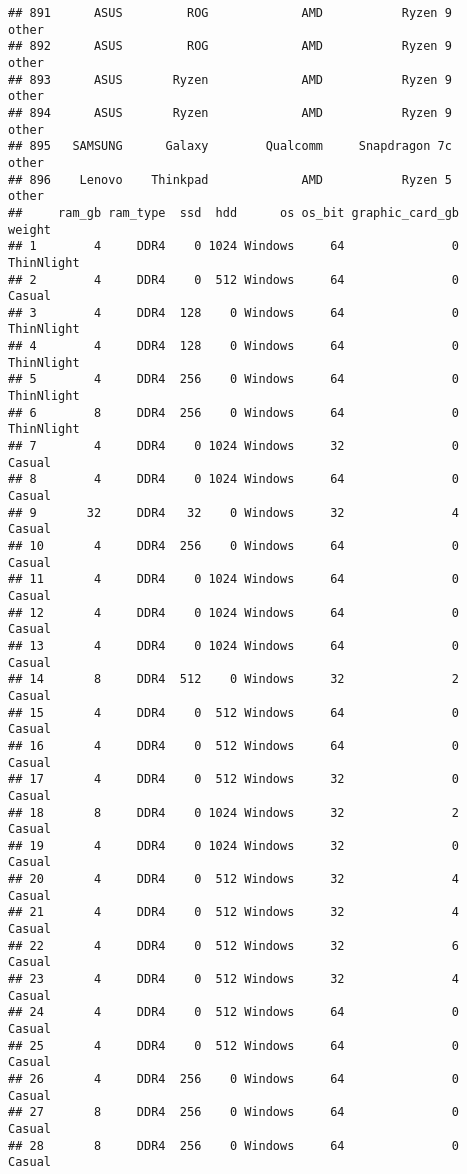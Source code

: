 \documentclass[
]{article}
\begin{document}
\begin{verbatim}
## 891      ASUS         ROG             AMD           Ryzen 9           other
## 892      ASUS         ROG             AMD           Ryzen 9           other
## 893      ASUS       Ryzen             AMD           Ryzen 9           other
## 894      ASUS       Ryzen             AMD           Ryzen 9           other
## 895   SAMSUNG      Galaxy        Qualcomm     Snapdragon 7c           other
## 896    Lenovo    Thinkpad             AMD           Ryzen 5           other
##     ram_gb ram_type  ssd  hdd      os os_bit graphic_card_gb     weight
## 1        4     DDR4    0 1024 Windows     64               0 ThinNlight
## 2        4     DDR4    0  512 Windows     64               0     Casual
## 3        4     DDR4  128    0 Windows     64               0 ThinNlight
## 4        4     DDR4  128    0 Windows     64               0 ThinNlight
## 5        4     DDR4  256    0 Windows     64               0 ThinNlight
## 6        8     DDR4  256    0 Windows     64               0 ThinNlight
## 7        4     DDR4    0 1024 Windows     32               0     Casual
## 8        4     DDR4    0 1024 Windows     64               0     Casual
## 9       32     DDR4   32    0 Windows     32               4     Casual
## 10       4     DDR4  256    0 Windows     64               0     Casual
## 11       4     DDR4    0 1024 Windows     64               0     Casual
## 12       4     DDR4    0 1024 Windows     64               0     Casual
## 13       4     DDR4    0 1024 Windows     64               0     Casual
## 14       8     DDR4  512    0 Windows     32               2     Casual
## 15       4     DDR4    0  512 Windows     64               0     Casual
## 16       4     DDR4    0  512 Windows     64               0     Casual
## 17       4     DDR4    0  512 Windows     32               0     Casual
## 18       8     DDR4    0 1024 Windows     32               2     Casual
## 19       4     DDR4    0 1024 Windows     32               0     Casual
## 20       4     DDR4    0  512 Windows     32               4     Casual
## 21       4     DDR4    0  512 Windows     32               4     Casual
## 22       4     DDR4    0  512 Windows     32               6     Casual
## 23       4     DDR4    0  512 Windows     32               4     Casual
## 24       4     DDR4    0  512 Windows     64               0     Casual
## 25       4     DDR4    0  512 Windows     64               0     Casual
## 26       4     DDR4  256    0 Windows     64               0     Casual
## 27       8     DDR4  256    0 Windows     64               0     Casual
## 28       8     DDR4  256    0 Windows     64               0     Casual

\end{verbatim}
\end{document}
